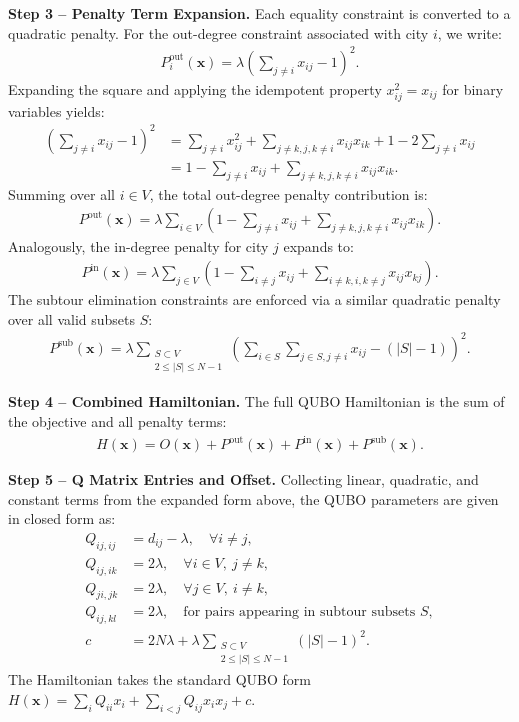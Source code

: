 \documentclass[12pt]{article}
\begin{document}
\textbf{Step 3 -- Penalty Term Expansion.}
Each equality constraint is converted to a quadratic penalty. For the out-degree constraint associated with city $i$, we write:
\begin{align}
    P_i^{\text{out}}(\mathbf{x}) = \lambda \left( \sum_{j \neq i} x_{ij} - 1 \right)^2.
\end{align}
Expanding the square and applying the idempotent property $x_{ij}^2 = x_{ij}$ for binary variables yields:
\begin{align}
    \left( \sum_{j \neq i} x_{ij} - 1 \right)^2 
    &= \sum_{j \neq i} x_{ij}^2 + \sum_{j \neq k, j,k \neq i} x_{ij}x_{ik} + 1 - 2\sum_{j \neq i} x_{ij} \\
    &= 1 - \sum_{j \neq i} x_{ij} + \sum_{j \neq k, j,k \neq i} x_{ij}x_{ik}.
\end{align}
Summing over all $i \in V$, the total out-degree penalty contribution is:
\begin{align}
    P^{\text{out}}(\mathbf{x}) = \lambda \sum_{i \in V} \left( 1 - \sum_{j \neq i} x_{ij} + \sum_{j \neq k, j,k \neq i} x_{ij}x_{ik} \right).
\end{align}
Analogously, the in-degree penalty for city $j$ expands to:
\begin{align}
    P^{\text{in}}(\mathbf{x}) = \lambda \sum_{j \in V} \left( 1 - \sum_{i \neq j} x_{ij} + \sum_{i \neq k, i,k \neq j} x_{ij}x_{kj} \right).
\end{align}
The subtour elimination constraints are enforced via a similar quadratic penalty over all valid subsets $S$:
\begin{align}
    P^{\text{sub}}(\mathbf{x}) = \lambda \sum_{\substack{S \subset V \\ 2 \le |S| \le N-1}} \left( \sum_{i \in S} \sum_{j \in S, j \neq i} x_{ij} - (|S|-1) \right)^2.
\end{align}

\textbf{Step 4 -- Combined Hamiltonian.}
The full QUBO Hamiltonian is the sum of the objective and all penalty terms:
\begin{align}
    H(\mathbf{x}) = O(\mathbf{x}) + P^{\text{out}}(\mathbf{x}) + P^{\text{in}}(\mathbf{x}) + P^{\text{sub}}(\mathbf{x}).
\end{align}

\textbf{Step 5 -- Q Matrix Entries and Offset.}
Collecting linear, quadratic, and constant terms from the expanded form above, the QUBO parameters are given in closed form as:
\begin{align}
    Q_{ij,ij} &= d_{ij} - \lambda, \quad \forall i \neq j, \\
    Q_{ij,ik} &= 2\lambda, \quad \forall i \in V, \ j \neq k, \\
    Q_{ji,jk} &= 2\lambda, \quad \forall j \in V, \ i \neq k, \\
    Q_{ij,kl} &= 2\lambda, \quad \text{for pairs appearing in subtour subsets } S, \\
    c &= 2N\lambda + \lambda \sum_{\substack{S \subset V \\ 2 \le |S| \le N-1}} (|S|-1)^2.
\end{align}
The Hamiltonian takes the standard QUBO form $H(\mathbf{x}) = \sum_{i} Q_{ii} x_i + \sum_{i < j} Q_{ij} x_i x_j + c$.
\end{document}
